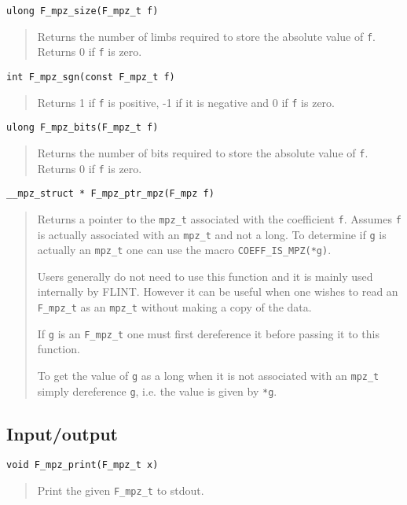 \documentclass[a4paper,10pt]{article}
\newcommand{\code}{\lstinline}
\begin{document}
\begin{lstlisting}
ulong F_mpz_size(F_mpz_t f)
\end{lstlisting}
\begin{quote}
Returns the number of limbs required to store the absolute value of \code{f}. Returns 0 if \code{f} is zero.
\end{quote}

\begin{lstlisting}
int F_mpz_sgn(const F_mpz_t f)
\end{lstlisting}
\begin{quote}
Returns 1 if \code{f} is positive, -1 if it is negative and 0 if \code{f} is zero.
\end{quote}

\begin{lstlisting}
ulong F_mpz_bits(F_mpz_t f)
\end{lstlisting}
\begin{quote}
Returns the number of bits required to store the absolute value of \code{f}. Returns 0 if \code{f} is zero.
\end{quote}

\begin{lstlisting}
__mpz_struct * F_mpz_ptr_mpz(F_mpz f)
\end{lstlisting}
\begin{quote}
Returns a pointer to the \code{mpz_t} associated with the coefficient \code{f}. Assumes \code{f} is actually associated with an \code{mpz_t} and not a long. To determine if \code{g} is actually an \code{mpz_t} one can use the macro \code{COEFF_IS_MPZ(*g)}.

Users generally do not need to use this function and it is mainly used internally by FLINT. However it can be useful when one wishes to read an \code{F_mpz_t} as an \code{mpz_t} without making a copy of the data. 

If \code{g} is an \code{F_mpz_t} one must first dereference it before passing it to this function. 

To get the value of \code{g} as a long when it is not associated with an \code{mpz_t} simply dereference \code{g}, i.e. the value is given by \code{*g}.
\end{quote}

\subsection{Input/output}

\begin{lstlisting}
void F_mpz_print(F_mpz_t x)
\end{lstlisting}
\begin{quote}
Print the given \code{F_mpz_t} to stdout.
\end{quote}
\end{document}
